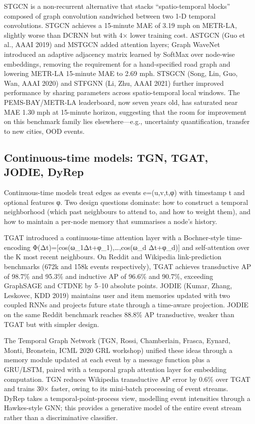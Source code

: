 \documentclass{article}
\begin{document}
STGCN \citep{yu2018spatiotemporalgrap} is a non-recurrent alternative that stacks ``spatio-temporal blocks'' composed of graph convolution sandwiched between two 1-D temporal convolutions. STGCN achieves a 15-minute MAE of 3.19 mph on METR-LA, slightly worse than DCRNN but with 4× lower training cost. ASTGCN (Guo et al., AAAI 2019) and MSTGCN added attention layers; Graph WaveNet \citep{wu2019graphwavenetfordee} introduced an adaptive adjacency matrix learned by SoftMax over node-wise embeddings, removing the requirement for a hand-specified road graph and lowering METR-LA 15-minute MAE to 2.69 mph. STSGCN (Song, Lin, Guo, Wan, AAAI 2020) and STFGNN (Li, Zhu, AAAI 2021) further improved performance by sharing parameters across spatio-temporal local windows. The PEMS-BAY/METR-LA leaderboard, now seven years old, has saturated near MAE 1.30 mph at 15-minute horizon, suggesting that the room for improvement on this benchmark family lies elsewhere---e.g., uncertainty quantification, transfer to new cities, OOD events.

\subsection{Continuous-time models: TGN, TGAT, JODIE, DyRep}\label{continuous-time-models-tgn-tgat-jodie-dyrep}

Continuous-time models treat edges as events e=(u,v,t,φ) with timestamp t and optional features φ. Two design questions dominate: how to construct a temporal neighborhood (which past neighbours to attend to, and how to weight them), and how to maintain a per-node memory that summarises a node's history.

TGAT \citep{xu2020inductiverepresent} introduced a continuous-time attention layer with a Bochner-style time-encoding Φ(Δt)={[}cos(ω\_1Δt+φ\_1),\ldots,cos(ω\_d Δt+φ\_d){]} and self-attention over the K most recent neighbours. On Reddit and Wikipedia link-prediction benchmarks (672k and 158k events respectively), TGAT achieves transductive AP of 98.7\% and 95.3\% and inductive AP of 96.6\% and 90.7\%, exceeding GraphSAGE and CTDNE by 5--10 absolute points. JODIE (Kumar, Zhang, Leskovec, KDD 2019) maintains user and item memories updated with two coupled RNNs and projects future state through a time-aware projection. JODIE on the same Reddit benchmark reaches 88.8\% AP transductive, weaker than TGAT but with simpler design.

The Temporal Graph Network (TGN, Rossi, Chamberlain, Frasca, Eynard, Monti, Bronstein, ICML 2020 GRL workshop) unified these ideas through a memory module updated at each event by a message function plus a GRU/LSTM, paired with a temporal graph attention layer for embedding computation. TGN reduces Wikipedia transductive AP error by 0.6\% over TGAT and trains 30× faster, owing to its mini-batch processing of event streams. DyRep \citep{trivedi2019dyreplearningrepre} takes a temporal-point-process view, modelling event intensities through a Hawkes-style GNN; this provides a generative model of the entire event stream rather than a discriminative classifier.
\end{document}

